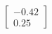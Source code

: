 \documentclass[preview]{standalone}
\begin{document}
\begin{align*}
\begin{bmatrix} -0.42 \\ 0.25 \end{bmatrix}
\end{align*}
\end{document}
